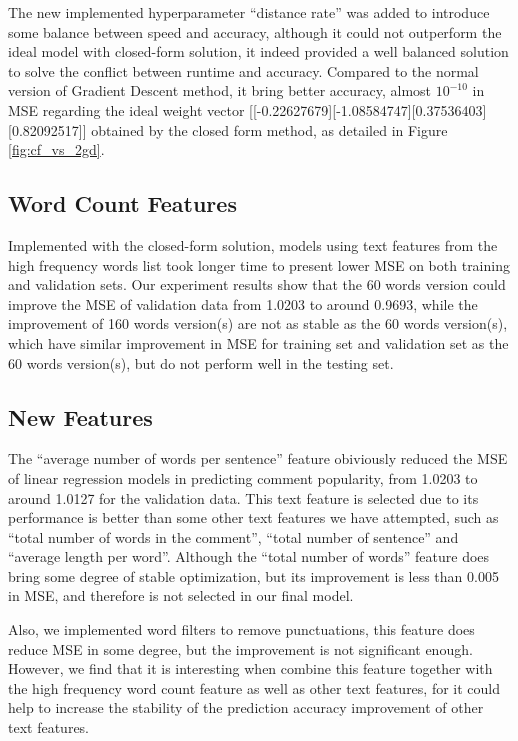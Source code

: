 \documentclass[letterpaper, 11pt]{article}
\begin{document}
The new implemented hyperparameter ``distance rate'' was added to introduce some balance between speed and accuracy, although it could not outperform the ideal model with closed-form solution, it indeed provided a well balanced solution to solve the conflict between runtime and accuracy. Compared to the normal version of Gradient Descent method, it bring better accuracy, almost $10^{-10}$ in MSE regarding the ideal weight vector [[-0.22627679][-1.08584747][0.37536403][0.82092517]] obtained by the closed form method, as detailed in Figure \ref{fig:cf_vs_2gd}.

\subsection*{Word Count Features}

Implemented with the closed-form solution, models using text features from the high frequency words list took longer time to present lower MSE on both training and validation sets. Our experiment results show that the 60 words version could improve the MSE of validation data from 1.0203 to around 0.9693, while the improvement of 160 words version(s) are not as stable as the 60 words version(s), which have similar improvement in MSE for training set and validation set as the 60 words version(s), but do not perform well in the testing set.

\subsection*{New Features}

The ``average number of words per sentence'' feature obiviously reduced the MSE of linear regression models in predicting comment popularity, from 1.0203 to around 1.0127 for the validation data. This text feature is selected due to its performance is better than some other text features we have attempted, such as ``total number of words in the comment'', ``total number of sentence'' and ``average length per word''. Although the ``total number of words'' feature does bring some degree of stable optimization, but its improvement is less than 0.005 in MSE, and therefore is not selected in our final model.

Also, we implemented word filters to remove punctuations, this feature does reduce MSE in some degree, but the improvement is not significant enough. However, we find that it is interesting when combine this feature together with the high frequency word count feature as well as other text features, for it could help to increase the stability of the prediction accuracy improvement of other text features.
\end{document}
